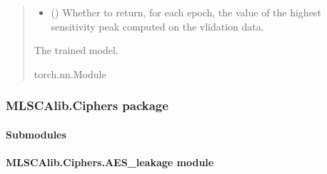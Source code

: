 \documentclass[letterpaper,10pt,english]{sphinxmanual}
\begin{document}
\begin{fulllineitems}
\begin{fulllineitems}
\begin{quote}
\begin{description}
\begin{itemize}
\item {} 
\sphinxAtStartPar
{} (\sphinxstyleliteralemphasis{\sphinxupquote{, }}) \textendash{} Whether to return, for each epoch, the value of the highest sensitivity peak
computed on the vlidation data.

\end{itemize}

\sphinxAtStartPar
{} \textendash{} The trained model.

\sphinxAtStartPar
torch.nn.Module

\end{description}\end{quote}

\end{fulllineitems}


\end{fulllineitems}


\sphinxstepscope


\subsubsection{MLSCAlib.Ciphers package}
\label{\detokenize{MLSCAlib.Ciphers:mlscalib-ciphers-package}}\label{\detokenize{MLSCAlib.Ciphers::doc}}

\paragraph{Submodules}
\label{\detokenize{MLSCAlib.Ciphers:submodules}}

\paragraph{MLSCAlib.Ciphers.AES\_leakage module}
\label{\detokenize{MLSCAlib.Ciphers:module-MLSCAlib.Ciphers.AES_leakage}}\label{\detokenize{MLSCAlib.Ciphers:mlscalib-ciphers-aes-leakage-module}}
\end{document}
